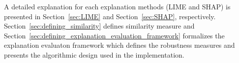 \documentclass[english]{tktltiki2}
\theoremstyle{definition}
\theoremstyle{remark}
\begin{document}
A detailed explanation for each explanation methods (LIME and SHAP) is presented in Section~\ref{sec:LIME} and Section~\ref{sec:SHAP}, respectively. Section~\ref{sec:defining_similarity} defines similarity measure and Section~\ref{sec:defining_explanation_evaluation_framework} formalizes the explanation evaluaton framework which defines the robustness measures and presents the algorithmic design used in the implementation.

%
%
\end{document}
